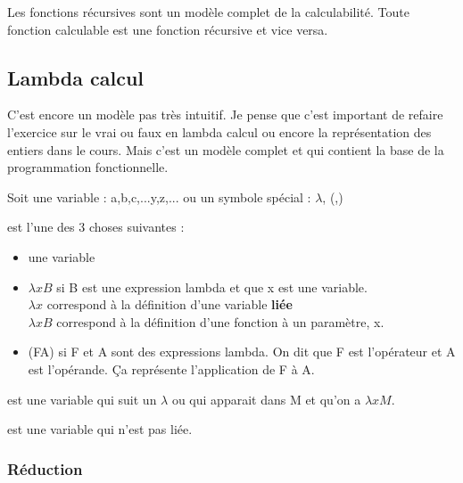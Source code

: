 \begin{myprop}
	Les fonctions récursives sont un modèle complet de la calculabilité. 
	Toute fonction calculable est une fonction récursive et vice versa.
\end{myprop}

\subsection{Lambda calcul}
\label{sub:lambda_calcul}
\begin{myrem}
	C'est encore un modèle pas très intuitif. Je pense que c'est important 
	de refaire l'exercice sur le vrai ou faux en lambda calcul ou encore la 
	représentation des entiers dans le cours. Mais c'est un modèle complet 
	et qui contient la base de la programmation fonctionnelle.
\end{myrem}

\begin{mydef} Soit une variable : a,b,c,...y,z,... ou un 
	symbole spécial : $\lambda$, (,)
\end{mydef}

\begin{mydef} est l'une des 3 choses suivantes :
	\begin{itemize}
		\item une variable
		\item $\lambda xB$ si B est une expression lambda et que x est 
			une variable. \\
			$\lambda x$ correspond à la définition 
			d'une variable \textbf{liée} \\
			$\lambda xB$ correspond à la définition d'une fonction 
			à un paramètre, x.
		\item (FA) si F et A sont des expressions lambda. On dit que F 
			est l'opérateur et A est l'opérande. Ça représente 
			l'application de F à A.
	\end{itemize}
\end{mydef}

\begin{mydef} est une variable qui suit un $\lambda$ ou qui 
	apparait dans M et qu'on a $\lambda xM$. 
\end{mydef}

\begin{mydef} est une variable qui n'est pas liée.
\end{mydef}

\subsubsection{Réduction}

